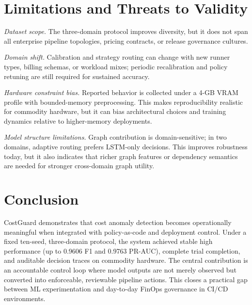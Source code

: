 \documentclass[journal]{IEEEtran}
\begin{document}
\FloatBarrier
\section{Limitations and Threats to Validity}
\textit{Dataset scope.} The three-domain protocol improves diversity, but it does not span all enterprise pipeline topologies, pricing contracts, or release governance cultures.

\textit{Domain shift.} Calibration and strategy routing can change with new runner types, billing schemas, or workload mixes; periodic recalibration and policy retuning are still required for sustained accuracy.

\textit{Hardware constraint bias.} Reported behavior is collected under a 4-GB VRAM profile with bounded-memory preprocessing. This makes reproducibility realistic for commodity hardware, but it can bias architectural choices and training dynamics relative to higher-memory deployments.

\textit{Model structure limitations.} Graph contribution is domain-sensitive; in two domains, adaptive routing prefers LSTM-only decisions. This improves robustness today, but it also indicates that richer graph features or dependency semantics are needed for stronger cross-domain graph utility.

\FloatBarrier
\section{Conclusion}
CostGuard demonstrates that cost anomaly detection becomes operationally meaningful when integrated with policy-as-code and deployment control. Under a fixed ten-seed, three-domain protocol, the system achieved stable high performance (up to 0.9606 F1 and 0.9763 PR-AUC), complete trial completion, and auditable decision traces on commodity hardware. The central contribution is an accountable control loop where model outputs are not merely observed but converted into enforceable, reviewable pipeline actions. This closes a practical gap between ML experimentation and day-to-day FinOps governance in CI/CD environments.
\end{document}
